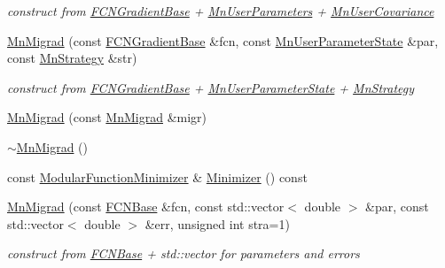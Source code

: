 \begin{DoxyCompactItemize}
\begin{DoxyCompactList}\small\item\em construct from \mbox{\hyperlink{classROOT_1_1Minuit2_1_1FCNGradientBase}{F\+C\+N\+Gradient\+Base}} + \mbox{\hyperlink{classROOT_1_1Minuit2_1_1MnUserParameters}{Mn\+User\+Parameters}} + \mbox{\hyperlink{classROOT_1_1Minuit2_1_1MnUserCovariance}{Mn\+User\+Covariance}} \end{DoxyCompactList}\item 
\mbox{\hyperlink{classROOT_1_1Minuit2_1_1MnMigrad_a0397e5984ab0d0163e69315b40a3d520}{Mn\+Migrad}} (const \mbox{\hyperlink{classROOT_1_1Minuit2_1_1FCNGradientBase}{F\+C\+N\+Gradient\+Base}} \&fcn, const \mbox{\hyperlink{classROOT_1_1Minuit2_1_1MnUserParameterState}{Mn\+User\+Parameter\+State}} \&par, const \mbox{\hyperlink{classROOT_1_1Minuit2_1_1MnStrategy}{Mn\+Strategy}} \&str)
\begin{DoxyCompactList}\small\item\em construct from \mbox{\hyperlink{classROOT_1_1Minuit2_1_1FCNGradientBase}{F\+C\+N\+Gradient\+Base}} + \mbox{\hyperlink{classROOT_1_1Minuit2_1_1MnUserParameterState}{Mn\+User\+Parameter\+State}} + \mbox{\hyperlink{classROOT_1_1Minuit2_1_1MnStrategy}{Mn\+Strategy}} \end{DoxyCompactList}\item 
\mbox{\hyperlink{classROOT_1_1Minuit2_1_1MnMigrad_a992fa22c62be692f5cd8f781c73475e0}{Mn\+Migrad}} (const \mbox{\hyperlink{classROOT_1_1Minuit2_1_1MnMigrad}{Mn\+Migrad}} \&migr)
\item 
\mbox{\hyperlink{classROOT_1_1Minuit2_1_1MnMigrad_a7a415c2b0378cf8f4606e53b7d20ae63}{$\sim$\+Mn\+Migrad}} ()
\item 
const \mbox{\hyperlink{classROOT_1_1Minuit2_1_1ModularFunctionMinimizer}{Modular\+Function\+Minimizer}} \& \mbox{\hyperlink{classROOT_1_1Minuit2_1_1MnMigrad_a98fa0ce74bf180a287093ac677e8644c}{Minimizer}} () const
\item 
\mbox{\hyperlink{classROOT_1_1Minuit2_1_1MnMigrad_a3a3610c55a91cb68fb3b95506ff08339}{Mn\+Migrad}} (const \mbox{\hyperlink{classROOT_1_1Minuit2_1_1FCNBase}{F\+C\+N\+Base}} \&fcn, const std\+::vector$<$ double $>$ \&par, const std\+::vector$<$ double $>$ \&err, unsigned int stra=1)
\begin{DoxyCompactList}\small\item\em construct from \mbox{\hyperlink{classROOT_1_1Minuit2_1_1FCNBase}{F\+C\+N\+Base}} + std\+::vector for parameters and errors \end{DoxyCompactList}\item 

\end{DoxyCompactItemize}
